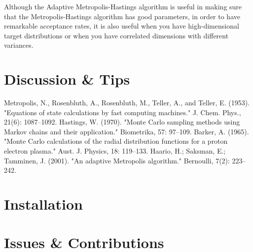 \documentclass[12pt,preprint]{aastex}
\newcommand{\project}[1]{{\sffamily #1}}
\newcommand{\Python}{\project{Python}}
\newcommand{\thisplain}{pipeline}
\newcommand{\this}{\project{\thisplain}}
\newcommand{\sectlabel}[1]{\label{sect:#1}}
\begin{document}
Although the Adaptive Metropolis-Hastings algorithm is useful in making sure that the Metropolis-Hastings algorithm has good parameters, in order to have remarkable acceptance rates, it is also useful when you have high-dimensional target distributions or when you have correlated dimensions with different variances.

\section{Discussion \& Tips}\sectlabel{advice}


\begin{thebibliography}{}\raggedright
{}
    Metropolis, N., Rosenbluth, A., Rosenbluth, M., Teller, A., and Teller, E. (1953). "Equations of state calculations by fast computing machines." J. Chem. Phys., 21(6): 1087–1092.
    Hastings, W. (1970). "Monte Carlo sampling methods using Markov chains and their application." Biometrika, 57: 97–109.
    Barker, A. (1965). "Monte Carlo calculations of the radial distribution functions for a proton electron plasma." Aust. J. Physics, 18: 119–133.
    Haario, H.; Saksman, E.; Tamminen, J. (2001). "An adaptive Metropolis algorithm." Bernoulli, 7(2): 223–242.
\end{thebibliography}

\clearpage
\appendix
\section{Installation}\sectlabel{install}

\section{Issues \& Contributions}
\end{document}
